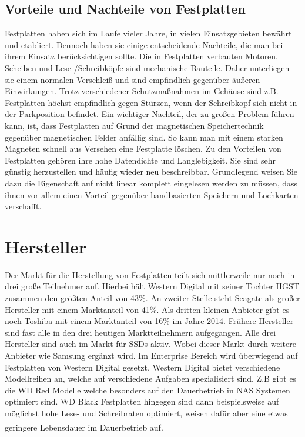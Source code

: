 \documentclass[a4paper, DIV20, 12pt, headsepline, parskip, flushleft]{scrartcl}
\begin{document}
\subsection{Vorteile und Nachteile von Festplatten}
Festplatten haben sich im Laufe vieler Jahre, in vielen Einsatzgebieten bewährt und etabliert. Dennoch haben sie einige entscheidende Nachteile, die man bei ihrem Einsatz berücksichtigen sollte.\newline
Die in Festplatten verbauten Motoren, Scheiben und Lese-/Schreibköpfe sind mechanische Bauteile. Daher unterliegen sie einem normalen Verschleiß und sind empfindlich gegenüber äußeren Einwirkungen.
Trotz verschiedener Schutzmaßnahmen im Gehäuse sind z.B. Festplatten höchst empfindlich gegen Stürzen, wenn der Schreibkopf sich nicht in der Parkposition befindet. 
Ein wichtiger Nachteil, der zu großen Problem führen kann, ist, dass Festplatten auf Grund der magnetischen Speichertechnik gegenüber magnetischen Felder anfällig sind. So kann man mit einem starken Magneten schnell aus Versehen eine Festplatte löschen.
\newline
Zu den Vorteilen von Festplatten gehören ihre hohe Datendichte und Langlebigkeit.
Sie sind sehr günstig herzustellen und häufig wieder neu beschreibbar. Grundlegend weisen Sie dazu die Eigenschaft auf nicht linear komplett eingelesen werden zu müssen, dass ihnen vor allem einen Vorteil gegenüber bandbasierten Speichern und Lochkarten verschafft.
\section{Hersteller}
Der Markt für die Herstellung von Festplatten teilt sich mittlerweile nur noch in drei große Teilnehmer auf.
Hierbei hält Western Digital mit seiner Tochter HGST zusammen den größten Anteil von 43\%. An zweiter Stelle steht Seagate als großer Hersteller mit einem Marktanteil von 41\%. Als dritten kleinen Anbieter gibt es noch Toshiba mit einem Marktanteil von 16\% im Jahre 2014. \newline
Frühere Hersteller sind fast alle in den drei heutigen Marktteilnehmern aufgegangen.
Alle drei Hersteller sind auch im Markt für SSDs aktiv. Wobei dieser Markt durch weitere Anbieter wie Samsung ergänzt wird.\newline
Im Enterprise Bereich wird überwiegend auf Festplatten von Western Digital gesetzt. Western Digital bietet verschiedene Modellreihen an, welche auf verschiedene Aufgaben spezialisiert sind. Z.B gibt es die WD Red Modelle welche besonders auf den Dauerbetrieb in NAS Systemen optimiert sind. WD Black Festplatten hingegen sind dann beispielsweise auf möglichst hohe Lese- und Schreibraten optimiert, weisen dafür aber eine etwas geringere Lebensdauer im Dauerbetrieb auf.
\textsuperscript{\cite{hdd} \cite{hddprod}}
\end{document}
